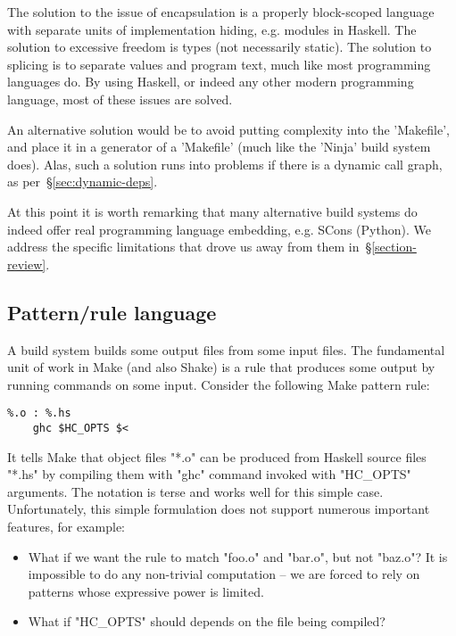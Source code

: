 The solution to the issue of encapsulation is a properly block-scoped language
with separate units of implementation hiding, e.g. modules in Haskell. The
solution to excessive freedom is types (not necessarily static). The solution to
splicing is to separate values and program text, much like most programming
languages do. By using Haskell, or indeed any other modern programming language,
most of these issues are solved.

An alternative solution would be to avoid putting complexity into the \lst'Makefile',
and place it in a generator of a \lst'Makefile' (much like the \lst'Ninja' build
system does). Alas, such a solution runs into problems if there is a dynamic call
graph, as per~\S\ref{sec:dynamic-deps}.

At this point it is worth remarking that many alternative build systems do
indeed offer real programming language embedding, e.g. SCons (Python). We
address the specific limitations that drove us away from them
in~\S\ref{section-review}.

\subsection{Pattern/rule language\label{sec:pattern-rule-language}}

A build system builds some output files from some input files. The fundamental
unit of work in Make (and also Shake) is a rule that produces some output by
running commands on some input. Consider the following Make pattern rule:

\begin{lstlisting}
%.o : %.hs
    ghc $HC_OPTS $<
\end{lstlisting}

\noindent It tells Make that object files \lst"*.o" can be produced from Haskell
source files \lst"*.hs" by compiling them with \lst"ghc" command invoked with
\lst"HC_OPTS" arguments. The notation is terse and works well for this simple
case. Unfortunately, this simple formulation does not support numerous important
features, for example:

\begin{itemize}
\item What if we want the rule to match \lst"foo.o" and \lst"bar.o", but not
\lst"baz.o"? It is impossible to do any non-trivial computation -- we are forced
to rely on patterns whose expressive power is limited.
\item What if \lst"HC_OPTS" should depends on the file being compiled?
\end{itemize}

